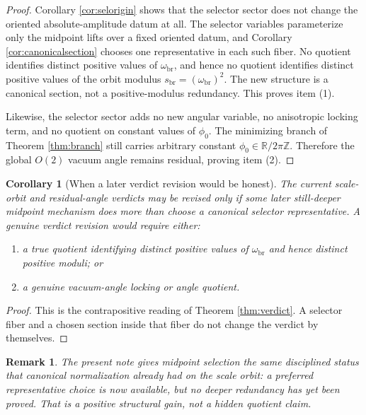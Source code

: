 \documentclass[11pt]{article}
\newcommand{\ScaleMod}{s_{\mathrm{br}}}
\newcommand{\AbsScaleAmp}{\omega_{\mathrm{br}}}
\newtheorem{remark}{Remark}
\newtheorem{corollary}{Corollary}
\begin{document}
\begin{proof}
Corollary \ref{cor:selorigin} shows that the selector sector does not change the oriented absolute-amplitude datum at all. The selector variables parameterize only the midpoint lifts over a fixed oriented datum, and Corollary \ref{cor:canonicalsection} chooses one representative in each such fiber. No quotient identifies distinct positive values of \(\AbsScaleAmp\), and hence no quotient identifies distinct positive values of the orbit modulus \(\ScaleMod=(\AbsScaleAmp)^{2}\). The new structure is a canonical section, not a positive-modulus redundancy. This proves item (1).

Likewise, the selector sector adds no new angular variable, no anisotropic locking term, and no quotient on constant values of \(\phi_{0}\). The minimizing branch of Theorem \ref{thm:branch} still carries arbitrary constant \(\phi_{0}\in\mathbb R/2\pi\mathbb Z\). Therefore the global \(O(2)\) vacuum angle remains residual, proving item (2).
\end{proof}

\begin{corollary}[When a later verdict revision would be honest]
\label{cor:revision}
The current scale-orbit and residual-angle verdicts may be revised only if some later still-deeper midpoint mechanism does more than choose a canonical selector representative. A genuine verdict revision would require either:
\begin{enumerate}
    \item a true quotient identifying distinct positive values of \(\AbsScaleAmp\) and hence distinct positive moduli; or
    \item a genuine vacuum-angle locking or angle quotient.
\end{enumerate}
\end{corollary}

\begin{proof}
This is the contrapositive reading of Theorem \ref{thm:verdict}. A selector fiber and a chosen section inside that fiber do not change the verdict by themselves.
\end{proof}

\begin{remark}
The present note gives midpoint selection the same disciplined status that canonical normalization already had on the scale orbit: a preferred representative choice is now available, but no deeper redundancy has yet been proved. That is a positive structural gain, not a hidden quotient claim.
\end{remark}
\end{document}
